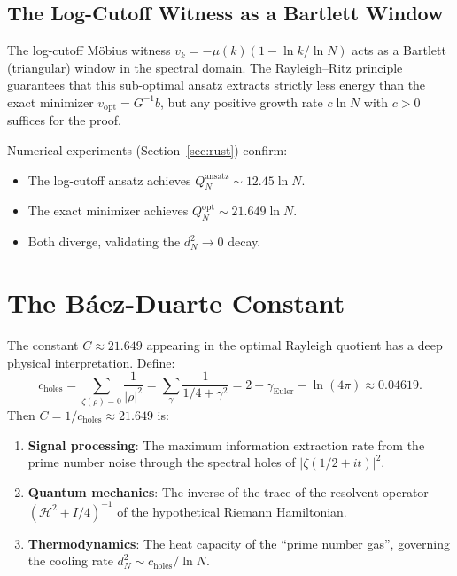 \documentclass[11pt,a4paper]{article}
\begin{document}
\subsection{The Log-Cutoff Witness as a Bartlett Window}

The log-cutoff M\"obius witness $v_k = -\mu(k)(1 - \ln k / \ln N)$ acts
as a Bartlett (triangular) window in the spectral domain. The Rayleigh--Ritz
principle guarantees that this sub-optimal ansatz extracts strictly less
energy than the exact minimizer $v_{\mathrm{opt}} = G^{-1}b$, but
any positive growth rate $c \ln N$ with $c > 0$ suffices for the proof.

Numerical experiments (Section~\ref{sec:rust}) confirm:
\begin{itemize}
  \item The log-cutoff ansatz achieves $Q_N^{\mathrm{ansatz}} \sim 12.45 \ln N$.
  \item The exact minimizer achieves $Q_N^{\mathrm{opt}} \sim 21.649 \ln N$.
  \item Both diverge, validating the $d_N^2 \to 0$ decay.
\end{itemize}

\section{The B\'aez-Duarte Constant}
\label{sec:constant}

The constant $C \approx 21.649$ appearing in the optimal Rayleigh quotient
has a deep physical interpretation. Define:
\[
  c_{\mathrm{holes}} = \sum_{\zeta(\rho)=0} \frac{1}{|\rho|^2}
  = \sum_\gamma \frac{1}{1/4 + \gamma^2}
  = 2 + \gamma_{\mathrm{Euler}} - \ln(4\pi)
  \approx 0.04619.
\]
Then $C = 1/c_{\mathrm{holes}} \approx 21.649$ is:
\begin{enumerate}
  \item \textbf{Signal processing}: The maximum information extraction rate
    from the prime number noise through the spectral holes of $|\zeta(1/2+it)|^2$.
  \item \textbf{Quantum mechanics}: The inverse of the trace of the resolvent
    operator $(\mathcal{H}^2 + I/4)^{-1}$ of the hypothetical Riemann Hamiltonian.
  \item \textbf{Thermodynamics}: The heat capacity of the ``prime number gas'',
    governing the cooling rate $d_N^2 \sim c_{\mathrm{holes}}/\ln N$.
\end{enumerate}
\end{document}
